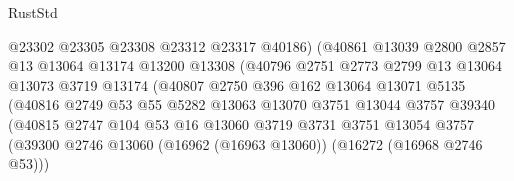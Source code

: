 \begin{lexlean}{RustStd}
\begin{coremodule}
                                  @23302
                                  @23305
                                  @23308
                                  @23312
                                  @23317
                                  @40186)
                                (@40861
                                  @13039
                                  @2800
                                  @2857
                                  @13
                                  @13064
                                  @13174
                                  @13200
                                  @13308
                                  (@40796
                                    @2751
                                    @2773
                                    @2799
                                    @13
                                    @13064
                                    @13073
                                    @3719
                                    @13174
                                    (@40807
                                      @2750
                                      @396
                                      @162
                                      @13064
                                      @13071
                                      @5135
                                      (@40816
                                        @2749
                                        @53
                                        @55
                                        @5282
                                        @13063
                                        @13070
                                        @3751
                                        @13044
                                        @3757
                                        @39340
                                        (@40815
                                          @2747
                                          @104
                                          @53
                                          @16
                                          @13060
                                          @3719
                                          @3731
                                          @3751
                                          @13054
                                          @3757
                                          (@39300
                                            @2746
                                            @13060
                                            (@16962 (@16963 @13060))
                                            (@16272 (@16968 @2746 @53)))

\end{coremodule}
\end{lexlean}
